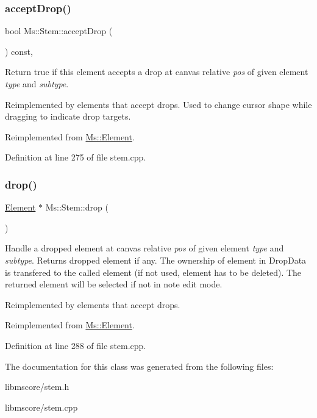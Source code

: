\subsubsection{\texorpdfstring{accept\+Drop()}{acceptDrop()}}
{\footnotesize\ttfamily bool Ms\+::\+Stem\+::accept\+Drop (\begin{DoxyParamCaption}\item[{\hyperlink{class_ms_1_1_edit_data}{Edit\+Data} \&}]{ }\end{DoxyParamCaption}) const\hspace{0.3cm}{\ttfamily [override]}, {\ttfamily [virtual]}}

Return true if this element accepts a drop at canvas relative {\itshape pos} of given element {\itshape type} and {\itshape subtype}.

Reimplemented by elements that accept drops. Used to change cursor shape while dragging to indicate drop targets. 

Reimplemented from \hyperlink{class_ms_1_1_element_a35614445f0bc2212cbcc75c3f5810543}{Ms\+::\+Element}.



Definition at line 275 of file stem.\+cpp.

\mbox{\label{class_ms_1_1_stem_adbefb546ff6099b87df6f750c20d8354}} 
\subsubsection{\texorpdfstring{drop()}{drop()}}
{\footnotesize\ttfamily \hyperlink{class_ms_1_1_element}{Element} $\ast$ Ms\+::\+Stem\+::drop (\begin{DoxyParamCaption}\item[{\hyperlink{class_ms_1_1_edit_data}{Edit\+Data} \&}]{ }\end{DoxyParamCaption})\hspace{0.3cm}{\ttfamily [virtual]}}

Handle a dropped element at canvas relative {\itshape pos} of given element {\itshape type} and {\itshape subtype}. Returns dropped element if any. The ownership of element in Drop\+Data is transfered to the called element (if not used, element has to be deleted). The returned element will be selected if not in note edit mode.

Reimplemented by elements that accept drops. 

Reimplemented from \hyperlink{class_ms_1_1_element_a0ca69a9fb48e7b9fb481aacaf3860032}{Ms\+::\+Element}.



Definition at line 288 of file stem.\+cpp.



The documentation for this class was generated from the following files\+:\begin{DoxyCompactItemize}
\item 
libmscore/stem.\+h\item 
libmscore/stem.\+cpp\end{DoxyCompactItemize}
